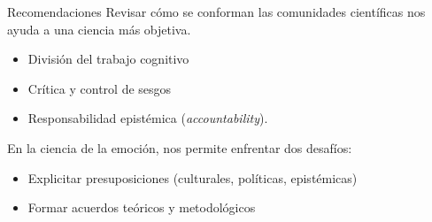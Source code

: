 \documentclass[%
  9pt,
  spanish, %
  ignorenonframetext,
  aspectratio=169, %
]{beamer}
\providecommand{\tightlist}{}
\begin{document}
\begin{frame}{Recomendaciones}
  \label{recomendaciones-2}
  Revisar cómo se conforman las comunidades científicas nos ayuda a una
  ciencia más objetiva. \pause

  \begin{itemize}
      \tightlist
    \item
      División del trabajo cognitivo \pause
    \item
      Crítica y control de sesgos \pause
    \item
      Responsabilidad epistémica (\emph{accountability}). \pause
  \end{itemize}

  En la ciencia de la emoción, nos permite enfrentar dos desafíos: \pause

  \begin{itemize}
      \tightlist
    \item
      Explicitar presuposiciones (culturales, políticas, epistémicas) \pause
    \item
      Formar acuerdos teóricos y metodológicos
  \end{itemize}
\end{frame}
\end{document}
